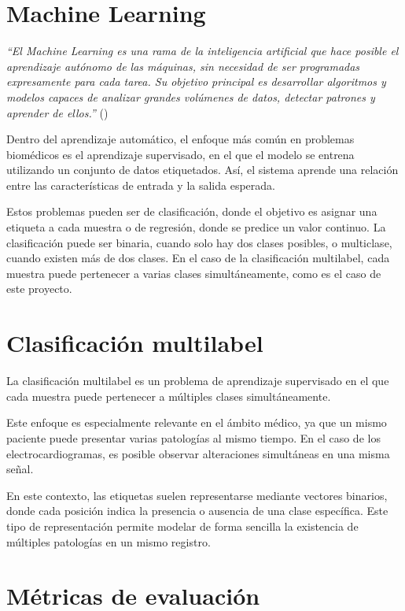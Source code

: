 \documentclass[12pt,a4paper,twoside]{book}
\begin{document}
\section{Machine Learning}

\textit{``El Machine Learning es una rama de la inteligencia artificial que hace posible el aprendizaje autónomo de las máquinas, sin necesidad de ser programadas expresamente para cada tarea. 
Su objetivo principal es desarrollar algoritmos y modelos capaces de analizar grandes volúmenes de datos, detectar patrones y aprender de ellos.''} (\cite{repsol_machine_learning})

Dentro del aprendizaje automático, el enfoque más común en problemas biomédicos es el aprendizaje supervisado, en el que el modelo se entrena utilizando un conjunto de datos etiquetados. 
Así, el sistema aprende una relación entre las características de entrada y la salida esperada.

Estos problemas pueden ser de clasificación, donde el objetivo es asignar una etiqueta a cada muestra o de regresión, donde se predice un valor continuo.
La clasificación puede ser binaria, cuando solo hay dos clases posibles, o multiclase, cuando existen más de dos clases. En el caso de la clasificación multilabel, cada muestra puede pertenecer a varias clases simultáneamente, como es el caso de este proyecto.

\section{Clasificación multilabel}

La clasificación multilabel es un problema de aprendizaje supervisado en el que cada muestra puede pertenecer a múltiples clases simultáneamente.

Este enfoque es especialmente relevante en el ámbito médico, ya que un mismo paciente puede presentar varias patologías al mismo tiempo. 
En el caso de los electrocardiogramas, es posible observar alteraciones simultáneas en una misma señal.

En este contexto, las etiquetas suelen representarse mediante vectores binarios, donde cada posición indica la presencia o ausencia de una clase específica.
Este tipo de representación permite modelar de forma sencilla la existencia de múltiples patologías en un mismo registro.

\section{Métricas de evaluación}
\end{document}
